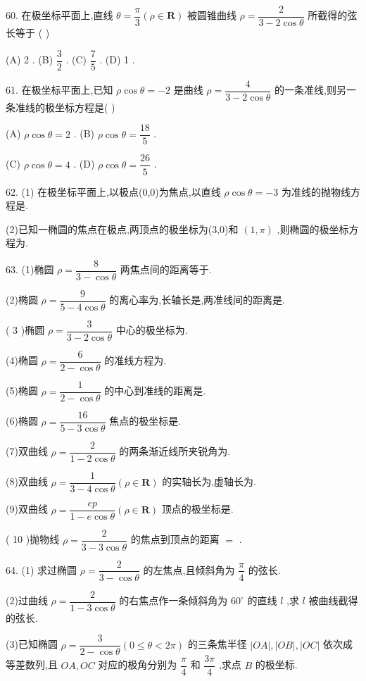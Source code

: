 60. 在极坐标平面上,直线 $\theta  = \dfrac{\pi }{3}\left( {\rho  \in  \mathbf{R}}\right)$ 被圆锥曲线 $\rho  = \dfrac{2}{3 - 2\cos \theta }$ 所截得的弦长等于 (   )

(A) 2 . (B) $\dfrac{3}{2}$ . (C) $\dfrac{7}{5}$ . (D) 1 .

61. 在极坐标平面上,已知 $\rho \cos \theta  =  - 2$ 是曲线 $\rho  = \dfrac{4}{3 - 2\cos \theta }$ 的一条准线,则另一条准线的极坐标方程是(   )

(A) $\rho \cos \theta  = 2$ . (B) $\rho \cos \theta  = \dfrac{18}{5}$ .

(C) $\rho \cos \theta  = 4$ . (D) $\rho \cos \theta  = \dfrac{26}{5}$ .

62. (1) 在极坐标平面上,以极点(0,0)为焦点,以直线 $\rho \cos \theta  =  - 3$ 为准线的抛物线方程是\blkda{}.

(2)已知一椭圆的焦点在极点,两顶点的极坐标为(3,0)和 $\left( {1,\pi }\right)$ ,则椭圆的极坐标方程为\blkda{}.

63. (1)椭圆 $\rho  = \dfrac{8}{3 - \cos \theta }$ 两焦点间的距离等于\blkda{}.

(2)椭圆 $\rho  = \dfrac{9}{5 - 4\cos \theta }$ 的离心率为\blkda{},长轴长是\blkda{},两准线间的距离是\blkda{}.

( 3 )椭圆 $\rho  = \dfrac{3}{3 - 2\cos \theta }$ 中心的极坐标为\blkda{}.

(4)椭圆 $\rho  = \dfrac{6}{2 - \cos \theta }$ 的准线方程为\blkda{}.

(5)椭圆 $\rho  = \dfrac{1}{2 - \cos \theta }$ 的中心到准线的距离是\blkda{}.

(6)椭圆 $\rho  = \dfrac{16}{5 - 3\cos \theta }$ 焦点的极坐标是\blkda{}.

(7)双曲线 $\rho  = \dfrac{2}{1 - 2\cos \theta }$ 的两条渐近线所夹锐角为\blkda{}.

(8)双曲线 $\rho  = \dfrac{1}{3 - 4\cos \theta }\left( {\rho  \in  \mathbf{R}}\right)$ 的实轴长为\blkda{},虚轴长为\blkda{}.

(9)双曲线 $\rho  = \dfrac{ep}{1 - e\cos \theta }\left( {\rho  \in  \mathbf{R}}\right)$ 顶点的极坐标是\blkda{}.

( 10 )抛物线 $\rho  = \dfrac{2}{3 - 3\cos \theta }$ 的焦点到顶点的距离 $=$ \blkda{}.

64. (1) 求过椭圆 $\rho  = \dfrac{2}{3 - \cos \theta }$ 的左焦点,且倾斜角为 $\dfrac{\pi }{4}$ 的弦长.

(2)过曲线 $\rho  = \dfrac{2}{1 - 3\cos \theta }$ 的右焦点作一条倾斜角为 ${60}^{ \circ  }$ 的直线 $l$ ,求 $l$ 被曲线截得的弦长.

(3)已知椭圆 $\rho  = \dfrac{3}{2 - \cos \theta }\left( {0 \leq  \theta  < {2\pi }}\right)$ 的三条焦半径 $\left| {OA}\right| ,\left| {OB}\right| ,\left| {OC}\right|$ 依次成等差数列,且 ${OA},{OC}$ 对应的极角分别为 $\dfrac{\pi }{4}$ 和 $\dfrac{3\pi }{4}$ ,求点 $B$ 的极坐标.

